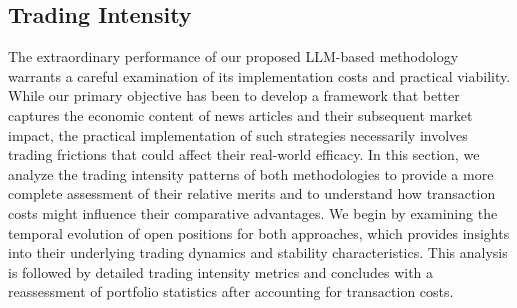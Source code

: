 \subsection{Trading Intensity} \label{sec:A8}
The extraordinary performance of our proposed LLM-based methodology warrants a careful examination of its implementation costs and practical viability. While our primary objective has been to develop a framework that better captures the economic content of news articles and their subsequent market impact, the practical implementation of such strategies necessarily involves trading frictions that could affect their real-world efficacy. In this section, we analyze the trading intensity patterns of both methodologies to provide a more complete assessment of their relative merits and to understand how transaction costs might influence their comparative advantages.
We begin by examining the temporal evolution of open positions for both approaches, which provides insights into their underlying trading dynamics and stability characteristics. This analysis is followed by detailed trading intensity metrics and concludes with a reassessment of portfolio statistics after accounting for transaction costs.


